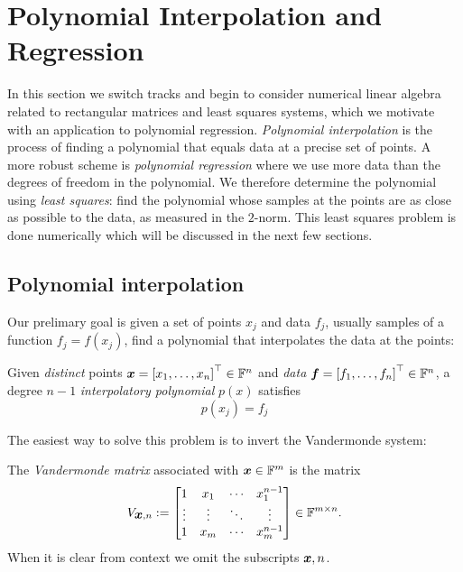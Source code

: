 
\section{Polynomial Interpolation and Regression}
In this section we switch tracks and begin to consider numerical linear algebra related to rectangular matrices and least squares systems, which we motivate with an application to polynomial regression. \emph{Polynomial interpolation} is the process of finding a polynomial that equals data at a precise set of points. A more robust scheme is \emph{polynomial regression} where we use more data than the degrees of freedom in the polynomial. We therefore determine the polynomial using \emph{least squares}: find the polynomial whose samples at the points are as close as possible to the data, as measured in the $2$-norm. This least squares problem is done numerically which will be discussed in the next few sections.

\subsection{Polynomial interpolation}
Our prelimary goal is given a set of points $x_j$ and data $f_j$, usually samples of a function $f_j = f(x_j)$, find a polynomial that interpolates the data at the points:

\begin{definition} Given \emph{distinct} points $\ensuremath{\bm{\x}} = \vectt[x_1,\ensuremath{\ldots},x_n] \ensuremath{\in} \ensuremath{\bbF}^n$ and \emph{data} $\ensuremath{\bm{\f}} = \vectt[f_1,\ensuremath{\ldots},f_n] \ensuremath{\in} \ensuremath{\bbF}^n$, a degree $n-1$ \emph{interpolatory polynomial} $p(x)$ satisfies
\[
p(x_j) = f_j
\]
\end{definition}

The easiest way to solve this problem is to invert the Vandermonde system:

\begin{definition}[Vandermonde] The \emph{Vandermonde matrix} associated with $\bm{{\mbox{\boldmath$x$\unboldmath}}} \in {\mathbb F}^m$ is the matrix
\[
V_{\ensuremath{\bm{\x}},n} := \begin{bmatrix} 1 & x_1 & \ensuremath{\cdots} & x_1^{n-1} \\
                    \ensuremath{\vdots} & \ensuremath{\vdots} & \ensuremath{\ddots} & \ensuremath{\vdots} \\
                    1 & x_m & \ensuremath{\cdots} & x_m^{n-1}
                    \end{bmatrix} \ensuremath{\in} \ensuremath{\bbF}^{m \ensuremath{\times} n}.
\]
When it is clear from context we omit the subscripts $\bm{{\mbox{\boldmath$x$\unboldmath}}},n$. \end{definition}

